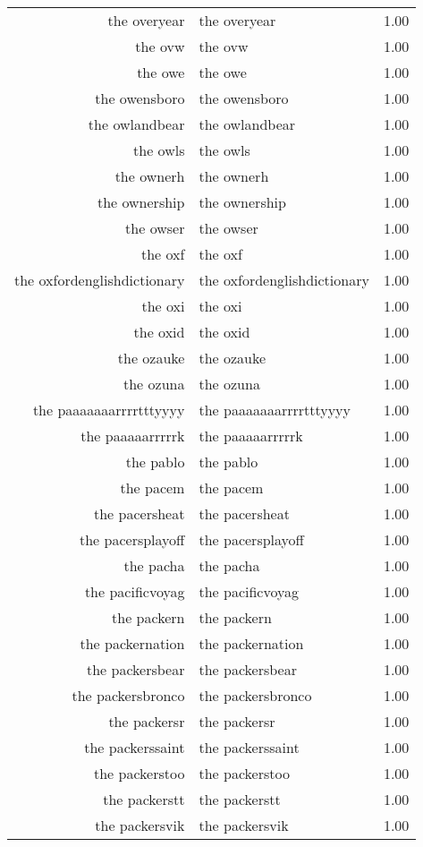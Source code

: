 \begin{table}[ht]
\begin{tabular}{rlr}
  the overyear & the overyear & 1.00 \\ 
  the ovw & the ovw & 1.00 \\ 
  the owe & the owe & 1.00 \\ 
  the owensboro & the owensboro & 1.00 \\ 
  the owlandbear & the owlandbear & 1.00 \\ 
  the owls & the owls & 1.00 \\ 
  the ownerh & the ownerh & 1.00 \\ 
  the ownership & the ownership & 1.00 \\ 
  the owser & the owser & 1.00 \\ 
  the oxf & the oxf & 1.00 \\ 
  the oxfordenglishdictionary & the oxfordenglishdictionary & 1.00 \\ 
  the oxi & the oxi & 1.00 \\ 
  the oxid & the oxid & 1.00 \\ 
  the ozauke & the ozauke & 1.00 \\ 
  the ozuna & the ozuna & 1.00 \\ 
  the paaaaaaarrrrtttyyyy & the paaaaaaarrrrtttyyyy & 1.00 \\ 
  the paaaaarrrrrk & the paaaaarrrrrk & 1.00 \\ 
  the pablo & the pablo & 1.00 \\ 
  the pacem & the pacem & 1.00 \\ 
  the pacersheat & the pacersheat & 1.00 \\ 
  the pacersplayoff & the pacersplayoff & 1.00 \\ 
  the pacha & the pacha & 1.00 \\ 
  the pacificvoyag & the pacificvoyag & 1.00 \\ 
  the packern & the packern & 1.00 \\ 
  the packernation & the packernation & 1.00 \\ 
  the packersbear & the packersbear & 1.00 \\ 
  the packersbronco & the packersbronco & 1.00 \\ 
  the packersr & the packersr & 1.00 \\ 
  the packerssaint & the packerssaint & 1.00 \\ 
  the packerstoo & the packerstoo & 1.00 \\ 
  the packerstt & the packerstt & 1.00 \\ 
  the packersvik & the packersvik & 1.00 \\ 

\end{tabular}
\end{table}
